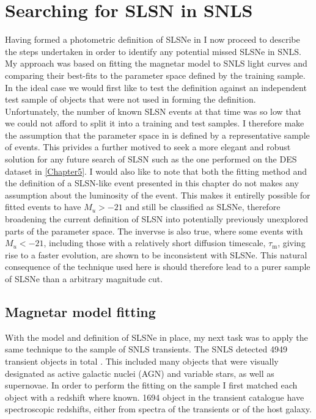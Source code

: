 \section{Searching for SLSN in SNLS}
Having formed a photometric definition of SLSNe in  I now proceed to describe the steps undertaken in order to identify any potential missed SLSNe in SNLS. My approach was based on fitting the magnetar model to SNLS light curves and comparing their best-fits to the parameter space defined by the training sample. In the ideal case we would first like to test the definition against an independent test sample of objects that were not used in forming the definition. Unfortunately, the number of known SLSN events at that time was so low that we could not afford to split it into a training and test samples. I therefore make the assumption that the parameter space in  is defined by a representative sample of events. This privides a further motived to seek a more elegant and robust solution for any future search of SLSN such as the one performed on the DES dataset in \cref{Chapter5}. I would also like to note that both the fitting method and the definition of a SLSN-like event presented in this chapter do not makes any assumption about the luminosity of the event. This makes it entirelly possible for fitted events to have $M_u>-21$ and still be classified as SLSNe, therefore broadening the current definition of SLSN into potentially previously unexplored parts of the parameter space. The invervse is also true, where some events with $M_u<-21$, including those with a relatively short diffusion timescale, $\tau_\mathrm{m}$, giving rise to a faster evolution, are shown to be inconsistent with SLSNe. This natural consequence of the technique used here is should therefore lead to a purer sample of SLSNe than a arbitrary magnitude cut.

\subsection{Magnetar model fitting}
With the model and definition of SLSNe in place, my next task was to apply the same technique to the sample of SNLS transients. The SNLS detected 4949 transient objects in total \citep{Perrett2010}. This included many objects that were visually designated as active galactic nuclei (AGN) and variable stars, as well as supernovae. In order to perform the fitting on the sample I first matched each object with a redshift where known. 1694 object in the transient catalogue have spectroscopic redshifts, either from spectra of the transients or of the host galaxy.

